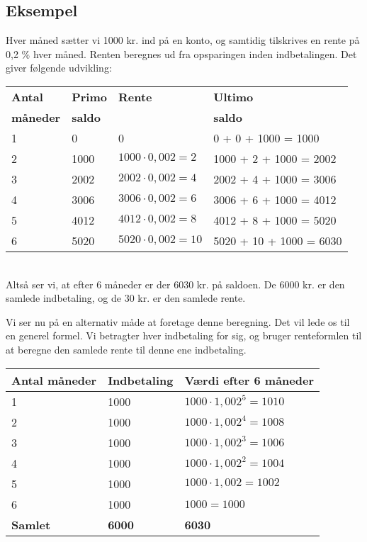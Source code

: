 \documentclass[12pt,oneside,a4paper]{article}
\begin{document}
\begin{tcolorbox}
\subsection{Eksempel}
Hver måned sætter vi 1000 kr. ind på en konto, og samtidig tilskrives en rente
på 0,2 $\%$ hver måned. Renten beregnes ud fra opsparingen inden indbetalingen.
Det giver følgende udvikling:
\\

\begin{tabular}{|l|l|l|l|}
    \hline
    \textbf{Antal} & \textbf{Primo} & \textbf{Rente} & \textbf{Ultimo} \\
    \textbf{måneder} & \textbf{saldo} &  & \textbf{saldo} \\
    \hline
    1 & 0 & 0 & 0 + 0 + 1000 = 1000 \\
    \hline
    2 & 1000 & $1000\cdot 0,002 = 2$ & 1000 + 2 + 1000 = 2002 \\
    \hline
    3 & 2002 & $2002\cdot 0,002 = 4$ & 2002 + 4 + 1000 = 3006 \\
    \hline
    4 & 3006 & $3006\cdot 0,002 = 6$ & 3006 + 6 + 1000 = 4012 \\
    \hline
    5 & 4012 & $4012\cdot 0,002 = 8$ & 4012 + 8 + 1000 = 5020 \\
    \hline
    6 & 5020 & $5020\cdot 0,002 = 10$ & 5020 + 10 + 1000 = 6030 \\
    \hline
\end{tabular}
\\

Altså ser vi, at efter 6 måneder er der 6030 kr. på saldoen. De 6000 kr. er den samlede
indbetaling, og de 30 kr. er den samlede rente.

Vi ser nu på en alternativ måde at foretage denne beregning. Det vil lede os til en generel
formel. Vi betragter hver indbetaling for sig, og bruger renteformlen til at beregne
den samlede rente til denne ene indbetaling.
\\

\begin{tabular}{|l|l|l|}
    \hline
    \textbf{Antal måneder} & \textbf{Indbetaling} & \textbf{Værdi efter 6 måneder} \\
    \hline
    1 & 1000 & $1000 \cdot 1,002^5 = 1010$ \\
    \hline
    2 & 1000 & $1000 \cdot 1,002^4 = 1008$ \\
    \hline
    3 & 1000 & $1000 \cdot 1,002^3 = 1006$ \\
    \hline
    4 & 1000 & $1000 \cdot 1,002^2 = 1004$ \\
    \hline
    5 & 1000 & $1000 \cdot 1,002 = 1002$ \\
    \hline
    6 & 1000 & $1000 = 1000$ \\
    \hline
    \textbf{Samlet} & \textbf{6000} & \textbf{6030} \\
    \hline
\end{tabular}
\\

\end{tcolorbox}
\end{document}
